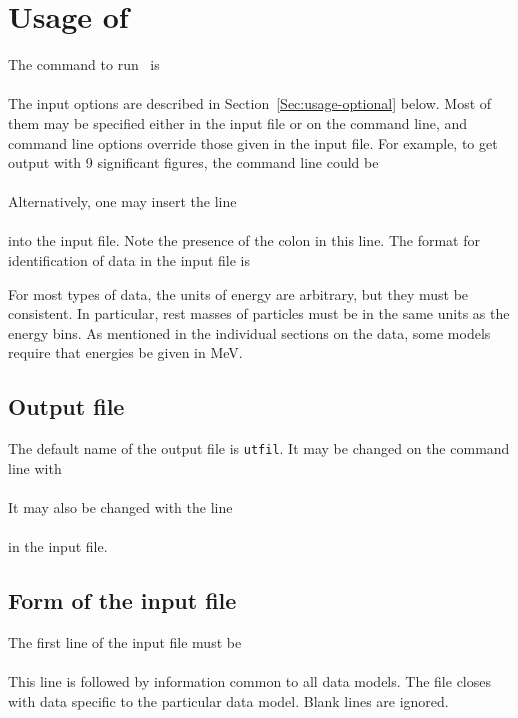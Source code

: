 \chapter{Usage of \gettransfer}
\label{Sec:usage}
The command to run \gettransfer\ is\\
  \\
The input options are described in Section~\ref{Sec:usage-optional} below.
Most of them may be specified either in the input file or on the
command line, and command line options override those given in the
input file.  For example, to get output with 9 significant figures,
the command line could be\\
\\
Alternatively, one may insert the line\\
   \\
into the input file.  Note the presence of the colon in this line.
The format for identification of data in the input file is\\

For most types of data, the units of energy are arbitrary, but they
must be consistent.  In particular, rest masses of particles must
be in the same units as the energy bins.  As mentioned in the
individual sections on the data, some models require that
energies be given in MeV.

\section{Output file}
The default name of the output file is \texttt{utfil}.  
It may be changed on the command line with\\
  \\
It may also be changed with the
line\\
  \\
  in the input file.

\section{Form of the input file}
The first line of the input file must be\\
  \\
This line is followed by information common to all data models.
The file closes with data specific to the particular data model.
Blank lines are ignored.
  

